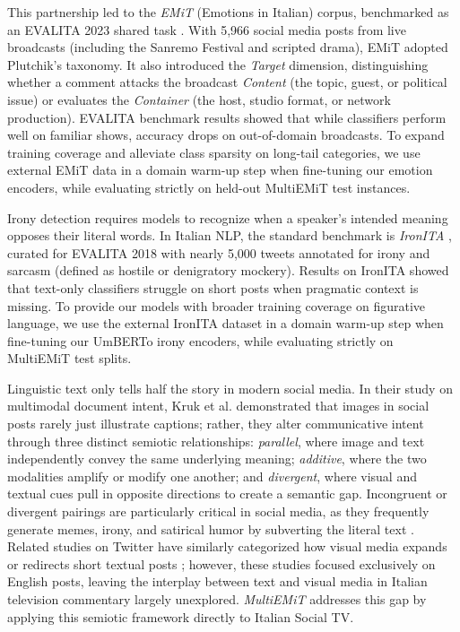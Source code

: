 This partnership led to the \textit{EMiT} (Emotions in Italian) corpus, benchmarked as an EVALITA 2023 shared task \cite{emit}. With 5,966 social media posts from live broadcasts (including the Sanremo Festival and scripted drama), EMiT adopted Plutchik's taxonomy. It also introduced the \textit{Target} dimension, distinguishing whether a comment attacks the broadcast \textit{Content} (the topic, guest, or political issue) or evaluates the \textit{Container} (the host, studio format, or network production). EVALITA benchmark results showed that while classifiers perform well on familiar shows, accuracy drops on out-of-domain broadcasts. To expand training coverage and alleviate class sparsity on long-tail categories, we use external EMiT data in a domain warm-up step when fine-tuning our emotion encoders, while evaluating strictly on held-out MultiEMiT test instances.

Irony detection requires models to recognize when a speaker's intended meaning opposes their literal words. In Italian NLP, the standard benchmark is \textit{IronITA} \cite{ironita2018}, curated for EVALITA 2018 with nearly 5,000 tweets annotated for irony and sarcasm (defined as hostile or denigratory mockery). Results on IronITA showed that text-only classifiers struggle on short posts when pragmatic context is missing. To provide our models with broader training coverage on figurative language, we use the external IronITA dataset in a domain warm-up step when fine-tuning our UmBERTo irony encoders, while evaluating strictly on MultiEMiT test splits.

Linguistic text only tells half the story in modern social media. In their study on multimodal document intent, Kruk et al. \cite{MultiM} demonstrated that images in social posts rarely just illustrate captions; rather, they alter communicative intent through three distinct semiotic relationships: \textit{parallel}, where image and text independently convey the same underlying meaning; \textit{additive}, where the two modalities amplify or modify one another; and \textit{divergent}, where visual and textual cues pull in opposite directions to create a semantic gap. Incongruent or divergent pairings are particularly critical in social media, as they frequently generate memes, irony, and satirical humor by subverting the literal text \cite{schifanella2016multimodal, cai2019multimodal}. Related studies on Twitter have similarly categorized how visual media expands or redirects short textual posts \cite{vempala2019categorizing}; however, these studies focused exclusively on English posts, leaving the interplay between text and visual media in Italian television commentary largely unexplored. \textit{MultiEMiT} addresses this gap by applying this semiotic framework directly to Italian Social TV.